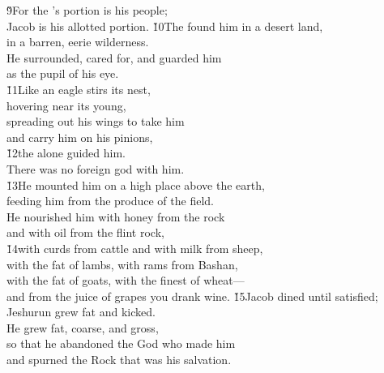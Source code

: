 \begin{poetry}
\poeml \v{9}For the 's portion is his people; \\
\poemll    Jacob is his allotted portion.
\poeml \v{10}The  found him in a desert land, \\
\poemll    in a barren, eerie wilderness. \\
\poeml He surrounded, cared for, and guarded him \\
\poemll    as the pupil of his eye. \\
\poeml \v{11}Like an eagle stirs its nest, \\
\poemll    hovering near its young, \\
\poeml spreading out his wings to take him \\
\poemll    and carry him on his pinions, \\
\poeml \v{12}the  alone guided him. \\
\poemll    There was no foreign god with him. \\
\poeml \v{13}He mounted him on a high place above the earth, \\
\poemll    feeding him from the produce of the field. \\
\poeml He nourished him with honey from the rock \\
\poemll    and with oil from the flint rock, \\
\poeml \v{14}with curds from cattle and with milk from sheep, \\
\poemll    with the fat of lambs, with rams from Bashan, \\
\poeml with the fat of goats, with the finest of wheat--- \\
\poemll    and from the juice of grapes you drank wine.
\poeml \v{15}Jacob dined until satisfied; \\
\poemll    Jeshurun grew fat and kicked. \\
\poeml He grew fat, coarse, and gross, \\
\poemll    so that he abandoned the God who made him \\
\poemlll       and spurned the Rock that was his salvation. \\

\end{poetry}
